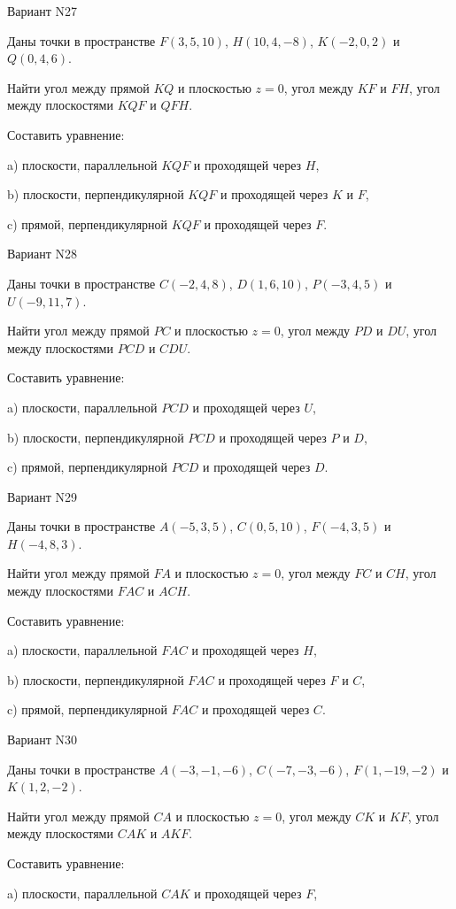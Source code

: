 \documentclass[11pt]{report}
\begin{document}
Вариант N27

Даны точки в пространстве
$F(3, 5, 10)$, $H(10, 4, -8)$, $K(-2, 0, 2)$ и
$Q(0, 4, 6)$.

Найти угол между прямой $KQ$ и плоскостью $z = 0$, угол между $KF$ и $FH$, угол между плоскостями $KQF$ 
и $QFH$.

Составить уравнение: 

a) плоскости, параллельной $KQF$ и проходящей через $H$,

b) плоскости, перпендикулярной $KQF$ и проходящей через $K$ и $F$,

c) прямой, перпендикулярной $KQF$ и проходящей через $F$.

Вариант N28

Даны точки в пространстве
$C(-2, 4, 8)$, $D(1, 6, 10)$, $P(-3, 4, 5)$ и
$U(-9, 11, 7)$.

Найти угол между прямой $PC$ и плоскостью $z = 0$, угол между $PD$ и $DU$, угол между плоскостями $PCD$ 
и $CDU$.

Составить уравнение: 

a) плоскости, параллельной $PCD$ и проходящей через $U$,

b) плоскости, перпендикулярной $PCD$ и проходящей через $P$ и $D$,

c) прямой, перпендикулярной $PCD$ и проходящей через $D$.

Вариант N29

Даны точки в пространстве
$A(-5, 3, 5)$, $C(0, 5, 10)$, $F(-4, 3, 5)$ и
$H(-4, 8, 3)$.

Найти угол между прямой $FA$ и плоскостью $z = 0$, угол между $FC$ и $CH$, угол между плоскостями $FAC$ 
и $ACH$.

Составить уравнение: 

a) плоскости, параллельной $FAC$ и проходящей через $H$,

b) плоскости, перпендикулярной $FAC$ и проходящей через $F$ и $C$,

c) прямой, перпендикулярной $FAC$ и проходящей через $C$.

Вариант N30

Даны точки в пространстве
$A(-3, -1, -6)$, $C(-7, -3, -6)$, $F(1, -19, -2)$ и
$K(1, 2, -2)$.

Найти угол между прямой $CA$ и плоскостью $z = 0$, угол между $CK$ и $KF$, угол между плоскостями $CAK$ 
и $AKF$.

Составить уравнение: 

a) плоскости, параллельной $CAK$ и проходящей через $F$,
\end{document}
